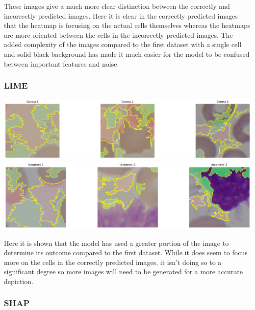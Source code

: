 \documentclass[
	a4paper,
	10pt,
	unnumberedsections,
	twoside,
]{research_article}
\begin{document}
These images give a much more clear distinction between the correctly and incorrectly predicted images. Here it is clear in the correctly predicted images that the heatmap is focusing on the actual cells themselves whereas the heatmaps are more oriented between the cells in the incorrectly predicted images. The added complexity of the images compared to the first dataset with a single cell and solid black background has made it much easier for the model to be confused between important features and noise.

\newpage
\subsubsection{LIME}

\begin{center}
	\includegraphics[width=\linewidth]{images/dataset2_lime_correct.png}
	\includegraphics[width=\linewidth]{images/dataset2_lime_incorrect.png}
\end{center}

Here it is shown that the model has used a greater portion of the image to determine its outcome compared to the first dataset. While it does seem to focus more on the cells in the correctly predicted images, it isn't doing so to a significant degree so more images will need to be generated for a more accurate depiction.

\newpage
\subsubsection{SHAP}
\end{document}
